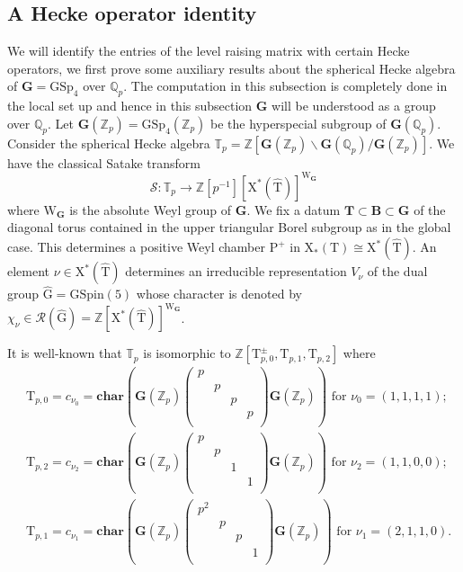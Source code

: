 \documentclass[10pt]{amsart}
\numberwithin{equation}{section}
\theoremstyle{definition}
\def\GSp{\mathrm{GSp}}
\def\GSpin{\mathrm{GSpin}}
\def\calS{\mathcal{S}}
\def\bfB{\mathbf{B}}
\def\bfG{\mathbf{G}}
\def\QQ{\mathbb{Q}}
\def\TT{\mathbb{T}}
\def\bfT{\mathbf{T}}
\def\ZZ{\mathbb{Z}}
\def\rmG{\mathrm{G}}
\def\rmP{\mathrm{P}}
\def\rmW{\mathrm{W}}
\def\rmX{\mathrm{X}}
\def\rmT{\mathrm{T}}
\begin{document}
\subsection{A Hecke operator identity} We will identify the entries of the level raising matrix with certain Hecke operators, we first prove some auxiliary results about the spherical Hecke algebra of $\bfG=\GSp_{4}$ over $\QQ_{p}$. The computation in this subsection is completely done in the local set up and hence in this subsection $\bfG$ will be understood as a group over $\QQ_{p}$. Let $\bfG(\ZZ_{p})=\GSp_{4}(\ZZ_{p})$ be the hyperspecial subgroup of $\bfG(\QQ_{p})$. Consider the spherical Hecke algebra $\TT_{p}=\ZZ[\bfG(\ZZ_{p})\backslash\bfG(\QQ_{p})/\bfG(\ZZ_{p})]$.  We have the classical Satake transform
\begin{equation*}
\calS:\TT_{p}\rightarrow\ZZ[p^{-1}][\mathrm{X}^{\ast}(\hat{\rmT})]^{\rmW_{\bfG}}
\end{equation*}
where $\rmW_{\bfG}$ is the absolute Weyl group of $\bfG$.
We fix a datum $\bfT\subset \bfB \subset \bfG$ of the diagonal torus contained in the upper triangular Borel subgroup as in the global case. This determines a positive Weyl chamber $\rmP^{+}$ in $\mathrm{X}_{\ast}(\rmT)\cong\mathrm{X}^{\ast}(\hat{\rmT})$. An element $\nu\in \mathrm{X}^{\ast}(\hat{\rmT})$ determines an irreducible representation $V_{\nu}$ of the dual group $\hat{\rmG}=\GSpin(5)$ whose character is denoted by $\chi_{\nu}\in \mathcal{R}(\hat{\rmG})=\ZZ[\rmX^{\ast}(\hat{\rmT})]^{\rmW_{\bfG}}$. 

It is well-known that $\TT_{p}$ is isomorphic to $\mathbb{Z}[\rmT^{\pm}_{p,0}, \rmT_{p,1}, \rmT_{p,2}]$ where 
\begin{equation*}
\begin{split}
&\rmT_{p,0}=c_{\nu_{0}}=\mathbf{char}(\bfG(\ZZ_{p})\begin{pmatrix}p&&&\\&p&&\\&&p&\\&&&p\\\end{pmatrix}\bfG(\ZZ_{p})) \text{ for }\nu_{0}=(1, 1, 1, 1);\\
&\rmT_{p,2}=c_{\nu_{2}}=\mathbf{char}(\bfG(\ZZ_{p})\begin{pmatrix}p&&&\\& p&&\\&&1&\\&&&1\\\end{pmatrix}\bfG(\ZZ_{p})) \text{ for }\nu_{2}=(1, 1, 0, 0);\\
&\rmT_{p,1}=c_{\nu_{1}}=\mathbf{char}(\bfG(\ZZ_{p})\begin{pmatrix}p^{2} &&&\\&p&&\\&&p&\\&&& 1\\\end{pmatrix}\bfG(\ZZ_{p})) \text{ for } \nu_{1}=(2, 1, 1, 0).\\
\end{split}
\end{equation*}
 
\end{document}
